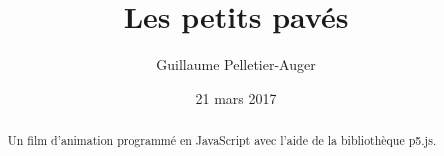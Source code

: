 \documentclass[10pt]{article}
\author{Guillaume Pelletier-Auger}
\title{Les petits pavés}
\date{21 mars 2017}
\begin{document}
\maketitle
\begin{abstract}
    Un film d'animation programmé en JavaScript avec l'aide de la bibliothèque p5.js.
\end{abstract}


% 
% 
\end{document}

